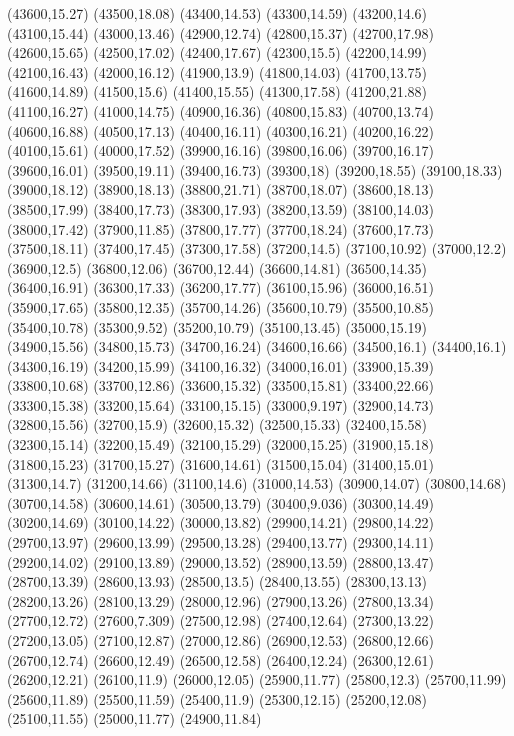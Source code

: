 (43600,15.27)
(43500,18.08)
(43400,14.53)
(43300,14.59)
(43200,14.6)
(43100,15.44)
(43000,13.46)
(42900,12.74)
(42800,15.37)
(42700,17.98)
(42600,15.65)
(42500,17.02)
(42400,17.67)
(42300,15.5)
(42200,14.99)
(42100,16.43)
(42000,16.12)
(41900,13.9)
(41800,14.03)
(41700,13.75)
(41600,14.89)
(41500,15.6)
(41400,15.55)
(41300,17.58)
(41200,21.88)
(41100,16.27)
(41000,14.75)
(40900,16.36)
(40800,15.83)
(40700,13.74)
(40600,16.88)
(40500,17.13)
(40400,16.11)
(40300,16.21)
(40200,16.22)
(40100,15.61)
(40000,17.52)
(39900,16.16)
(39800,16.06)
(39700,16.17)
(39600,16.01)
(39500,19.11)
(39400,16.73)
(39300,18)
(39200,18.55)
(39100,18.33)
(39000,18.12)
(38900,18.13)
(38800,21.71)
(38700,18.07)
(38600,18.13)
(38500,17.99)
(38400,17.73)
(38300,17.93)
(38200,13.59)
(38100,14.03)
(38000,17.42)
(37900,11.85)
(37800,17.77)
(37700,18.24)
(37600,17.73)
(37500,18.11)
(37400,17.45)
(37300,17.58)
(37200,14.5)
(37100,10.92)
(37000,12.2)
(36900,12.5)
(36800,12.06)
(36700,12.44)
(36600,14.81)
(36500,14.35)
(36400,16.91)
(36300,17.33)
(36200,17.77)
(36100,15.96)
(36000,16.51)
(35900,17.65)
(35800,12.35)
(35700,14.26)
(35600,10.79)
(35500,10.85)
(35400,10.78)
(35300,9.52)
(35200,10.79)
(35100,13.45)
(35000,15.19)
(34900,15.56)
(34800,15.73)
(34700,16.24)
(34600,16.66)
(34500,16.1)
(34400,16.1)
(34300,16.19)
(34200,15.99)
(34100,16.32)
(34000,16.01)
(33900,15.39)
(33800,10.68)
(33700,12.86)
(33600,15.32)
(33500,15.81)
(33400,22.66)
(33300,15.38)
(33200,15.64)
(33100,15.15)
(33000,9.197)
(32900,14.73)
(32800,15.56)
(32700,15.9)
(32600,15.32)
(32500,15.33)
(32400,15.58)
(32300,15.14)
(32200,15.49)
(32100,15.29)
(32000,15.25)
(31900,15.18)
(31800,15.23)
(31700,15.27)
(31600,14.61)
(31500,15.04)
(31400,15.01)
(31300,14.7)
(31200,14.66)
(31100,14.6)
(31000,14.53)
(30900,14.07)
(30800,14.68)
(30700,14.58)
(30600,14.61)
(30500,13.79)
(30400,9.036)
(30300,14.49)
(30200,14.69)
(30100,14.22)
(30000,13.82)
(29900,14.21)
(29800,14.22)
(29700,13.97)
(29600,13.99)
(29500,13.28)
(29400,13.77)
(29300,14.11)
(29200,14.02)
(29100,13.89)
(29000,13.52)
(28900,13.59)
(28800,13.47)
(28700,13.39)
(28600,13.93)
(28500,13.5)
(28400,13.55)
(28300,13.13)
(28200,13.26)
(28100,13.29)
(28000,12.96)
(27900,13.26)
(27800,13.34)
(27700,12.72)
(27600,7.309)
(27500,12.98)
(27400,12.64)
(27300,13.22)
(27200,13.05)
(27100,12.87)
(27000,12.86)
(26900,12.53)
(26800,12.66)
(26700,12.74)
(26600,12.49)
(26500,12.58)
(26400,12.24)
(26300,12.61)
(26200,12.21)
(26100,11.9)
(26000,12.05)
(25900,11.77)
(25800,12.3)
(25700,11.99)
(25600,11.89)
(25500,11.59)
(25400,11.9)
(25300,12.15)
(25200,12.08)
(25100,11.55)
(25000,11.77)
(24900,11.84)
